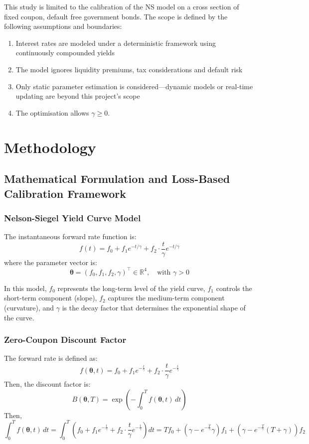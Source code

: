 \documentclass[12pt]{article}
\begin{document}
This study is limited to the calibration of the NS model on a cross section of fixed coupon, default free government bonds. The scope is defined by the following assumptions and boundaries:

\begin{enumerate}
    \item Interest rates are modeled under a deterministic framework using continuously compounded yields
    \item The model ignores liquidity premiums, tax considerations and default risk
    \item Only static parameter estimation is considered—dynamic models or real‑time updating are beyond this project’s scope
    \item The optimisation allows $\gamma\geq0$. 
\end{enumerate}

\section{Methodology}\label{sec:method}

\subsection{Mathematical Formulation and Loss-Based Calibration Framework}

\subsubsection{Nelson-Siegel Yield Curve Model}

The instantaneous forward rate function is:
\[
f(t) = f_0 + f_1 e^{-t/\gamma} + f_2 \cdot \frac{t}{\gamma} e^{-t/\gamma}
\]
where the parameter vector is:
\[
\boldsymbol{\theta} = (f_0, f_1, f_2, \gamma)^\top \in \mathbb{R}^4, \quad \text{with } \gamma > 0
\]

In this model, \( f_0 \) represents the long-term level of the yield curve, \( f_1 \) controls the short-term component (slope), \( f_2 \) captures the medium-term component (curvature), and \( \gamma \) is the decay factor that determines the exponential shape of the curve.


\subsubsection{Zero-Coupon Discount Factor}

The forward rate is defined as:
\[
f(\boldsymbol{\theta}, t) = f_0 + f_1 e^{- \frac{t}{\gamma}} + f_2 \cdot \frac{t}{\gamma} e^{- \frac{t}{\gamma}}
\]
Then, the discount factor is:
\[
B(\boldsymbol{\theta}, T) = \exp\left( - \int_0^T f(\boldsymbol{\theta}, t) \, dt \right)
\]
Then,
\[
 \int_0^T f(\boldsymbol{\theta}, t) \, dt =
\int_0^T \left( f_0 + f_1 e^{- \frac{t}{\gamma}} + f_2 \cdot \frac{t}{\gamma} e^{- \frac{t}{\gamma}} \right) dt
= T f_0 + \left( \gamma - e^{- \frac{T}{\gamma}} \gamma \right) f_1 + \left( \gamma - e^{- \frac{T}{\gamma}} (T + \gamma) \right) f_2
\]
\end{document}
